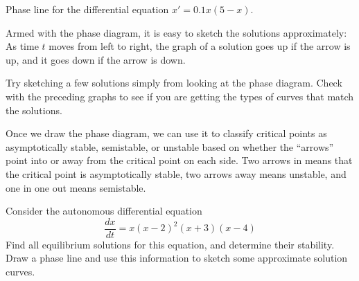 \documentclass{ximera}
\begin{document}
\begin{myfig}
    
    \caption{Phase line for the differential equation $x' = 0.1x(5-x)$.}
    \label{fig:PL1}
\end{myfig}

Armed with the phase diagram, it is easy to sketch the solutions approximately:  As time $t$ moves from left to right, the graph of a solution goes up if the arrow is up, and it goes down if the arrow is down.

\begin{exercise}
    Try sketching a few solutions simply from looking at the phase diagram. Check with the preceding graphs to see if you are getting the types of curves that match the solutions.
\end{exercise}


Once we draw the phase diagram, we can use it to classify critical points as asymptotically stable, semistable, or unstable based on whether the ``arrows'' point into or away from the critical point on each side. Two arrows in means that the critical point is asymptotically stable, two arrows away means unstable, and one in one out means semistable. 



\begin{example}
    Consider the autonomous differential equation
    \begin{equation}
        \frac{dx}{dt} = x(x-2)^2(x+3)(x-4) \label{autoexample:eqn}
    \end{equation}
    Find all equilibrium solutions for this equation, and determine their stability. Draw a phase line and use this information to sketch some approximate solution curves. 
\end{example}
\end{document}
